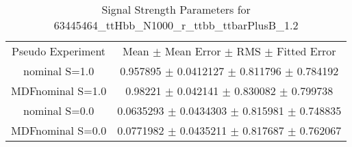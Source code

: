 \begin{table}
\centering
\caption{Signal Strength Parameters for 63445464\_ttHbb\_N1000\_r\_ttbb\_ttbarPlusB\_1.2}
\begin{tabular}{cc}
\toprule
Pseudo Experiment & Mean $\pm$ Mean Error $\pm$ RMS $\pm$ Fitted Error\\
nominal S=1.0 & \num{0.957895} $\pm$ \num{0.0412127} $\pm$ \num{0.811796} $\pm$ \num{0.784192}\\
MDFnominal S=1.0 & \num{0.98221} $\pm$ \num{0.042141} $\pm$ \num{0.830082} $\pm$ \num{0.799738}\\
nominal S=0.0 & \num{0.0635293} $\pm$ \num{0.0434303} $\pm$ \num{0.815981} $\pm$ \num{0.748835}\\
MDFnominal S=0.0 & \num{0.0771982} $\pm$ \num{0.0435211} $\pm$ \num{0.817687} $\pm$ \num{0.762067}\\
\bottomrule
\end{tabular}
\end{table}